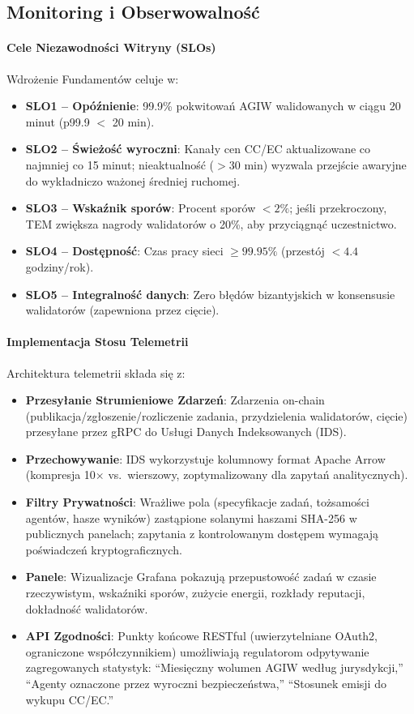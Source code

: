 \documentclass[11pt]{article}
\begin{document}
\subsection{Monitoring i Obserwowalność}
\paragraph{Cele Niezawodności Witryny (SLOs)} Wdrożenie Fundamentów celuje w:
\begin{itemize}[noitemsep]
  \item \textbf{SLO1 -- Opóźnienie}: 99.9\% pokwitowań AGIW walidowanych w ciągu 20 minut (p99.9 $<$ 20 min).
  \item \textbf{SLO2 -- Świeżość wyroczni}: Kanały cen CC/EC aktualizowane co najmniej co 15 minut; nieaktualność ($>30$ min) wyzwala przejście awaryjne do wykładniczo ważonej średniej ruchomej.
  \item \textbf{SLO3 -- Wskaźnik sporów}: Procent sporów $<2\%$; jeśli przekroczony, TEM zwiększa nagrody walidatorów o 20\%, aby przyciągnąć uczestnictwo.
  \item \textbf{SLO4 -- Dostępność}: Czas pracy sieci $\geq 99.95\%$ (przestój $<4.4$ godziny/rok).
  \item \textbf{SLO5 -- Integralność danych}: Zero błędów bizantyjskich w konsensusie walidatorów (zapewniona przez cięcie).
\end{itemize}

\paragraph{Implementacja Stosu Telemetrii} Architektura telemetrii składa się z:
\begin{itemize}[noitemsep]
  \item \textbf{Przesyłanie Strumieniowe Zdarzeń}: Zdarzenia on-chain (publikacja/zgłoszenie/rozliczenie zadania, przydzielenia walidatorów, cięcie) przesyłane przez gRPC do Usługi Danych Indeksowanych (IDS).
  \item \textbf{Przechowywanie}: IDS wykorzystuje kolumnowy format Apache Arrow (kompresja 10$\times$ vs.\ wierszowy, zoptymalizowany dla zapytań analitycznych).
  \item \textbf{Filtry Prywatności}: Wrażliwe pola (specyfikacje zadań, tożsamości agentów, hasze wyników) zastąpione solanymi haszami SHA-256 w publicznych panelach; zapytania z kontrolowanym dostępem wymagają poświadczeń kryptograficznych.
  \item \textbf{Panele}: Wizualizacje Grafana pokazują przepustowość zadań w czasie rzeczywistym, wskaźniki sporów, zużycie energii, rozkłady reputacji, dokładność walidatorów.
  \item \textbf{API Zgodności}: Punkty końcowe RESTful (uwierzytelniane OAuth2, ograniczone współczynnikiem) umożliwiają regulatorom odpytywanie zagregowanych statystyk: ``Miesięczny wolumen AGIW według jurysdykcji,'' ``Agenty oznaczone przez wyroczni bezpieczeństwa,'' ``Stosunek emisji do wykupu CC/EC.''
\end{itemize}
\end{document}
